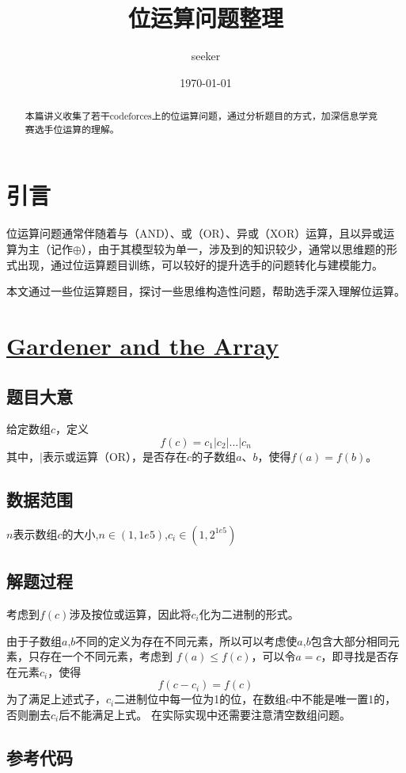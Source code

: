 \documentclass[UTF8]{ctexart}
\title{位运算问题整理}
\author{seeker}
\date{\today}
\begin{document}
	\maketitle
	\begin{abstract}
		本篇讲义收集了若干codeforces上的位运算问题，通过分析题目的方式，加深信息学竞赛选手位运算的理解。
	\end{abstract}
	\section{引言}
	位运算问题通常伴随着与（AND）、或（OR）、异或（XOR）运算，且以异或运算为主（记作$\oplus$），由于其模型较为单一，涉及到的知识较少，通常以思维题的形式出现，通过位运算题目训练，可以较好的提升选手的问题转化与建模能力。
	
	本文通过一些位运算题目，探讨一些思维构造性问题，帮助选手深入理解位运算。
	\section{\href{https://codeforces.com/problemset/problem/1775/B}{Gardener and the Array}}
	\subsection{题目大意}
	给定数组$c$，定义$$f(c)=c_1|c_2|...|c_n$$其中，$|$表示或运算（OR），是否存在$c$的子数组$a$、$b$，使得$f(a)=f(b)$。
	\subsection{数据范围}
	$n$表示数组$c$的大小,$n\in(1,1e5)$,$c_i\in(1,2^{1e5})$
	\subsection{解题过程}
	考虑到$f(c)$涉及按位或运算，因此将$c_i$化为二进制的形式。
	
	由于子数组$a$,$b$不同的定义为存在不同元素，所以可以考虑使$a$,$b$包含大部分相同元素，只存在一个不同元素，考虑到
	$f(a)\leq  f(c)$，可以令$a=c$，即寻找是否存在元素$c_i$，使得
	$$f(c-c_i)=f(c)$$
	为了满足上述式子，$c_i$二进制位中每一位为1的位，在数组$c$中不能是唯一置1的，否则删去$c_i$后不能满足上式。
	在实际实现中还需要注意清空数组问题。
	\subsection{参考代码}
	
	
\end{document}

